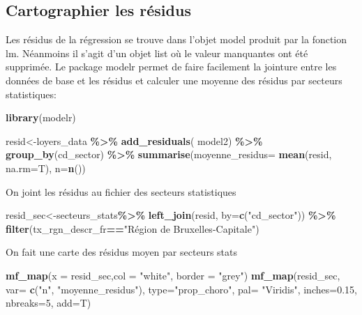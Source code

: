 \documentclass[
]{book}
\newenvironment{Shaded}{\begin{snugshade}}{\end{snugshade}}
\newcommand{\AttributeTok}[1]{\textcolor[rgb]{0.13,0.29,0.53}{#1}}
\newcommand{\DecValTok}[1]{\textcolor[rgb]{0.00,0.00,0.81}{#1}}
\newcommand{\FloatTok}[1]{\textcolor[rgb]{0.00,0.00,0.81}{#1}}
\newcommand{\FunctionTok}[1]{\textcolor[rgb]{0.13,0.29,0.53}{\textbf{#1}}}
\newcommand{\NormalTok}[1]{#1}
\newcommand{\OtherTok}[1]{\textcolor[rgb]{0.56,0.35,0.01}{#1}}
\newcommand{\SpecialCharTok}[1]{\textcolor[rgb]{0.81,0.36,0.00}{\textbf{#1}}}
\newcommand{\StringTok}[1]{\textcolor[rgb]{0.31,0.60,0.02}{#1}}
\begin{document}
\hypertarget{cartographier-les-ruxe9sidus}{%
\subsection{Cartographier les résidus}\label{cartographier-les-ruxe9sidus}}

Les résidus de la régression se trouve dans l'objet model produit par la
fonction lm. Néanmoins il s'agit d'un objet list où le valeur manquantes
ont été supprimée. Le package modelr permet de faire facilement la
jointure entre les données de base et les résidus et calculer une
moyenne des résidus par secteurs statistiques:

\begin{Shaded}
\begin{Highlighting}[]
\FunctionTok{library}\NormalTok{(modelr)}

\NormalTok{resid}\OtherTok{\textless{}{-}}\NormalTok{loyers\_data }\SpecialCharTok{\%\textgreater{}\%}
  \FunctionTok{add\_residuals}\NormalTok{( model2) }\SpecialCharTok{\%\textgreater{}\%}
  \FunctionTok{group\_by}\NormalTok{(cd\_sector) }\SpecialCharTok{\%\textgreater{}\%}
  \FunctionTok{summarise}\NormalTok{(}\AttributeTok{moyenne\_residus=} \FunctionTok{mean}\NormalTok{(resid, }\AttributeTok{na.rm=}\NormalTok{T),}
            \AttributeTok{n=}\FunctionTok{n}\NormalTok{())}
\end{Highlighting}
\end{Shaded}

On joint les résidus au fichier des secteurs statistiques

\begin{Shaded}
\begin{Highlighting}[]
\NormalTok{resid\_sec}\OtherTok{\textless{}{-}}\NormalTok{secteurs\_stats}\SpecialCharTok{\%\textgreater{}\%}
  \FunctionTok{left\_join}\NormalTok{(resid, }\AttributeTok{by=}\FunctionTok{c}\NormalTok{(}\StringTok{"cd\_sector"}\NormalTok{)) }\SpecialCharTok{\%\textgreater{}\%}
  \FunctionTok{filter}\NormalTok{(tx\_rgn\_descr\_fr}\SpecialCharTok{==}\StringTok{"Région de Bruxelles{-}Capitale"}\NormalTok{)}
\end{Highlighting}
\end{Shaded}

On fait une carte des résidus moyen par secteurs stats

\begin{Shaded}
\begin{Highlighting}[]
\FunctionTok{mf\_map}\NormalTok{(}\AttributeTok{x =}\NormalTok{ resid\_sec,}\AttributeTok{col =} \StringTok{"white"}\NormalTok{, }\AttributeTok{border =} \StringTok{"grey"}\NormalTok{)}
\FunctionTok{mf\_map}\NormalTok{(resid\_sec,}
       \AttributeTok{var=} \FunctionTok{c}\NormalTok{(}\StringTok{"n"}\NormalTok{, }\StringTok{"moyenne\_residus"}\NormalTok{),}
       \AttributeTok{type=}\StringTok{"prop\_choro"}\NormalTok{,}
       \AttributeTok{pal=} \StringTok{"Viridis"}\NormalTok{,}
       \AttributeTok{inches=}\FloatTok{0.15}\NormalTok{,}
       \AttributeTok{nbreaks=}\DecValTok{5}\NormalTok{,}
       \AttributeTok{add=}\NormalTok{T)}
\end{Highlighting}
\end{Shaded}
\end{document}
